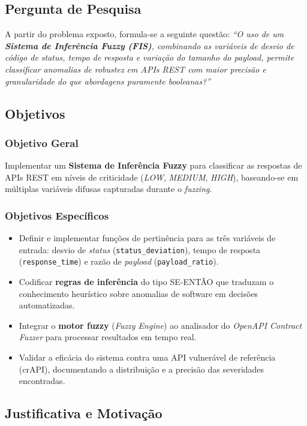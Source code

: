 \subsection{Pergunta de Pesquisa}

A partir do problema exposto, formula-se a seguinte questão: \textit{``O uso de um \textbf{Sistema de Inferência Fuzzy (FIS)}, combinando as variáveis de desvio de código de \textit{status}, tempo de resposta e variação do tamanho do \textit{payload}, permite classificar anomalias de robustez em APIs REST com maior precisão e granularidade do que abordagens puramente booleanas?''}

\subsection{Objetivos}

\subsubsection*{Objetivo Geral}
Implementar um \textbf{Sistema de Inferência Fuzzy} para classificar as respostas de APIs REST em níveis de criticidade (\textit{LOW}, \textit{MEDIUM}, \textit{HIGH}), baseando-se em múltiplas variáveis difusas capturadas durante o \textit{fuzzing}.

\subsubsection*{Objetivos Específicos}
\begin{itemize}
    \item Definir e implementar funções de pertinência para as três variáveis de entrada: desvio de \textit{status} (\texttt{status\_deviation}), tempo de resposta (\texttt{response\_time}) e razão de \textit{payload} (\texttt{payload\_ratio}).
    \item Codificar \textbf{regras de inferência} do tipo SE-ENTÃO que traduzam o conhecimento heurístico sobre anomalias de software em decisões automatizadas.
    \item Integrar o \textbf{motor fuzzy} (\textit{Fuzzy Engine}) ao analisador do \textit{OpenAPI Contract Fuzzer} para processar resultados em tempo real.
    \item Validar a eficácia do sistema contra uma API vulnerável de referência (crAPI), documentando a distribuição e a precisão das severidades encontradas.
\end{itemize}

\subsection{Justificativa e Motivação}

